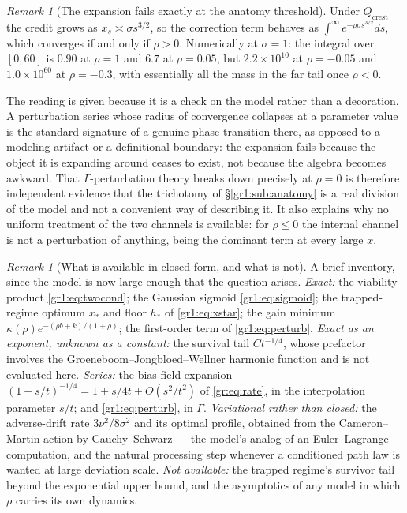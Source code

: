 \documentclass[11pt]{article}
\numberwithin{equation}{section}
\theoremstyle{plain}
\theoremstyle{definition}
\theoremstyle{remark}
\newtheorem{remark}[theorem]{Remark}
\begin{document}
\begin{remark}[The expansion fails exactly at the anatomy threshold]
\label{gr1:rem:perturbfail}
Under $Q_{\mathrm{crest}}$ the credit grows as $x_s\asymp\sigma
s^{3/2}$, so the correction term behaves as
$\int^\infty e^{-\rho\sigma s^{3/2}}ds$, which converges if and only if
$\rho>0$. Numerically at $\sigma=1$: the integral over $[0,60]$ is
$0.90$ at $\rho=1$ and $6.7$ at $\rho=0.05$, but $2.2\times10^{10}$ at
$\rho=-0.05$ and $1.0\times10^{60}$ at $\rho=-0.3$, with essentially all
the mass in the far tail once $\rho<0$.

The reading is given because it is a check on the model rather
than a decoration. A perturbation series whose radius of convergence
collapses at a parameter value is the standard signature of a genuine
phase transition there, as opposed to a modeling artifact or a
definitional boundary: the expansion fails because the object it is
expanding around ceases to exist, not because the algebra becomes
awkward. That $\Gamma$-perturbation theory breaks down precisely at
$\rho=0$ is therefore independent evidence that the trichotomy of
\S\ref{gr1:sub:anatomy} is a real division of the model and not a
convenient way of describing it. It also explains why no uniform
treatment of the two channels is available: for $\rho\le0$ the internal
channel is not a perturbation of anything, being the dominant term at
every large $x$.
\end{remark}

\begin{remark}[What is available in closed form, and what is not]
\label{gr1:rem:closedform}
A brief inventory, since the model is now large enough that the question
arises. \emph{Exact:} the viability product \eqref{gr1:eq:twocond}; the
Gaussian sigmoid \eqref{gr1:eq:sigmoid}; the trapped-regime optimum
$x_\ast$ and floor $h_\ast$ of \eqref{gr1:eq:xstar}; the gain minimum
$\kappa(\rho)e^{-(\rho b+k)/(1+\rho)}$; the first-order term of
\eqref{gr1:eq:perturb}. \emph{Exact as an exponent, unknown as a
constant:} the survival tail $Ct^{-1/4}$, whose prefactor involves the
Groeneboom--Jongbloed--Wellner harmonic function and is not evaluated
here. \emph{Series:} the bias field expansion
$(1-s/t)^{-1/4}=1+s/4t+O(s^2/t^2)$ of \eqref{gr:eq:rate}, in the
interpolation parameter $s/t$; and \eqref{gr1:eq:perturb}, in $\Gamma$.
\emph{Variational rather than closed:} the adverse-drift rate
$3\nu^{2}/8\sigma^{2}$ and its optimal profile, obtained from the
Cameron--Martin action by Cauchy--Schwarz --- the model's analog of an
Euler--Lagrange computation, and the natural processing step whenever a
conditioned path law is wanted at large deviation scale.
\emph{Not available:} the trapped regime's survivor tail beyond the
exponential upper bound, and the asymptotics of any model in which
$\rho$ carries its own dynamics.
\end{remark}
\end{document}
